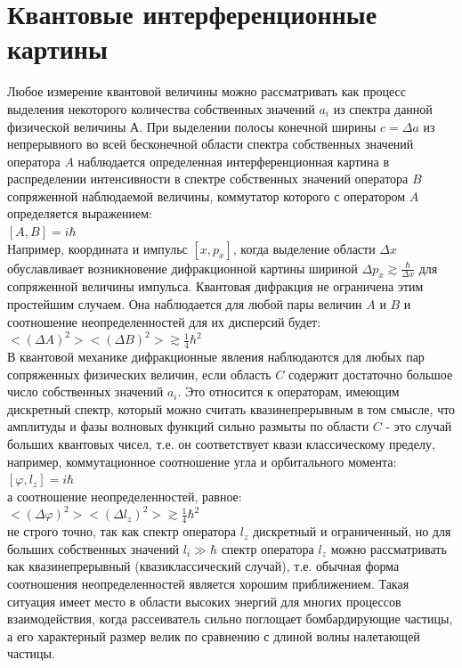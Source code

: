 \documentclass[11pt]{report}
\begin{document}
\section{Квантовые интерференционные картины}
 Любое измерение квантовой величины можно рассматривать как процесс выделения некоторого количества собственных значений $a_i$ из спектра данной физической величины А. При выделении полосы конечной ширины $c=\Delta a$ из непрерывного во всей бесконечной области спектра собственных значений оператора $A$ наблюдается определенная интерференционная картина в распределении интенсивности в спектре собственных значений оператора $B$ сопряженной наблюдаемой величины, коммутатор которого с оператором $A$ определяется выражением:\\
 
 $[A,B] = i\hbar$ \\
 
 Например, координата и импульс $[x,p_x]$, когда выделение области $\Delta x$ обуславливает возникновение дифракционной картины шириной $\Delta p_x \gtrsim \frac{\hbar}{\Delta x}$ для сопряженной величины импульса. Квантовая дифракция не ограничена этим простейшим случаем. Она наблюдается для любой пары величин $A$ и $B$ и соотношение неопределенностей для их дисперсий будет: \\

 $<(\Delta A)^2><(\Delta B)^2> \gtrsim \frac{1}{4}\hbar^2$ \\

 В квантовой механике дифракционные явления наблюдаются для любых пар сопряженных физических величин, если область $C$ содержит достаточно большое число собственных значений $a_i$. Это относится к операторам, имеющим дискретный спектр, который можно считать квазинепрерывным в том смысле, что амплитуды и фазы волновых функций сильно размыты по области $C$ - это случай больших квантовых чисел, т.е. он соответствует квази классическому пределу, например, коммутационное соотношение угла и орбитального момента: \\
 
  $[\varphi,l_z] = i\hbar$ \\
  
  а соотношение неопределенностей, равное: \\
  
$<(\Delta \varphi)^2><(\Delta l_z)^2> \gtrsim \frac{1}{4}\hbar^2$ \\

не строго точно, так как спектр оператора $l_z$ дискретный и ограниченный, но для больших собственных значений $ l_i \gg \hbar$ спектр оператора $l_z$ можно рассматривать как квазинепрерывный (квазиклассический случай), т.е. обычная форма соотношения неопределенностей является хорошим приближением. Такая ситуация имеет место в области высоких энергий для многих процессов взаимодействия, когда рассеиватель сильно поглощает бомбардирующие частицы, а его характерный размер велик по сравнению с длиной волны налетающей частицы. \\
\end{document}
